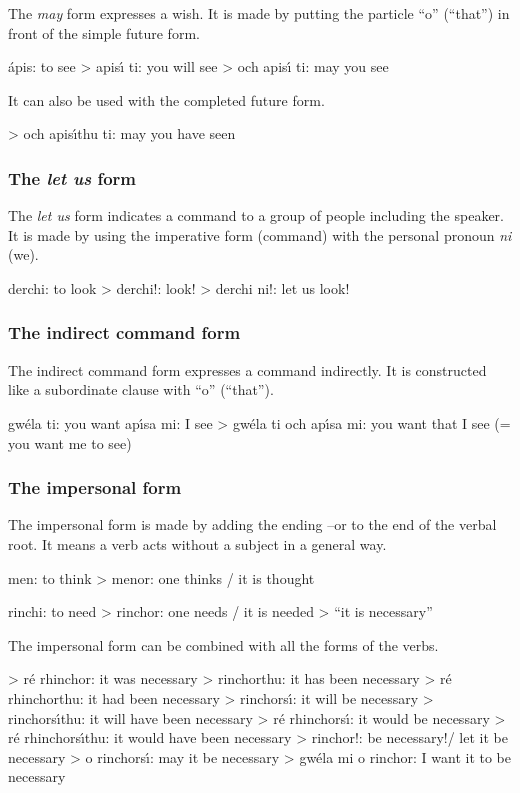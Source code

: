 The \textit{may} form expresses a wish. It is made by putting the particle “o” (“that”) in front of the simple future form.

\'{a}pis: to see
> apis\'{\i} ti: you will see
> och apis\'{\i} ti: may you see

It can also be used with the completed future form.

> och apis\'{\i}thu ti: may you have seen

\subsubsection{The \textit{let us} form}

The \textit{let us} form indicates a command to a group of people including the speaker. It is made by using the imperative form (command) with the personal pronoun \textit{ni} (we).

derchi: to look
> derchi!: look!
> derchi ni!: let us look!

\subsubsection{The indirect command form}

The indirect command form expresses a command indirectly. It is constructed like a subordinate clause with “o” (“that”).

gw\'{e}la ti: you want
ap\'{\i}sa mi: I see
> gw\'{e}la ti och ap\'{\i}sa mi: you want that I see (= you want me to see)

\subsubsection{The impersonal form}

The impersonal form is made by adding the ending –or to the end of the verbal root. It means a verb acts without a subject in a general way.

men: to think
> menor: one thinks / it is thought 

rinchi: to need
> rinchor: one needs / it is needed > “it is necessary”

The impersonal form can be combined with all the forms of the verbs.

> r\'{e} rhinchor: it was necessary
> rinchorthu: it has been necessary
> r\'{e} rhinchorthu: it had been necessary
> rinchors\'{\i}: it will be necessary
> rinchors\'{\i}thu: it will have been necessary
> r\'{e} rhinchors\'{\i}: it would be necessary
> r\'{e} rhinchors\'{\i}thu: it would have been necessary
> rinchor!: be necessary!/ let it be necessary
> o rinchors\'{\i}: may it be necessary
> gw\'{e}la mi o rinchor: I want it to be necessary


